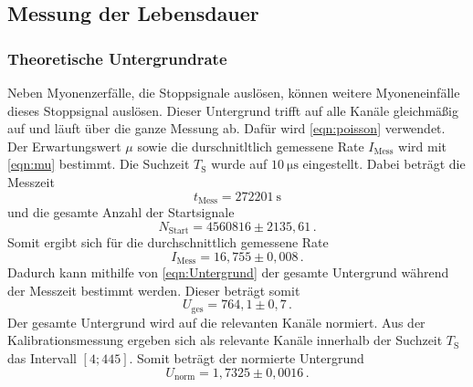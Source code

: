\subsection{Messung der Lebensdauer}
  \subsubsection{Theoretische Untergrundrate}
    Neben Myonenzerfälle, die Stoppsignale auslösen, können weitere Myoneneinfälle dieses Stoppsignal auslösen.
    Dieser Untergrund trifft auf alle Kanäle gleichmäßig auf und läuft über die ganze Messung ab.
    Dafür wird \eqref{eqn:poisson} verwendet.
    Der Erwartungswert $\mu$ sowie die durschnitltlich gemessene Rate $I_\text{Mess}$ wird mit \eqref{eqn:mu} bestimmt.
    Die Suchzeit $T_\text{S}$ wurde auf $\SI{10}{\micro\second}$ eingestellt.
    Dabei beträgt die Messzeit
    \begin{equation*}
      t_\text{Mess} = \SI{272201}{\second}
    \end{equation*}
    und die gesamte Anzahl der Startsignale
    \begin{equation*}
      N_\text{Start} = 4560816 \pm 2135,61 \, .
    \end{equation*}
    Somit ergibt sich für die durchschnittlich gemessene Rate
    \begin{equation*}
      I_\text{Mess} = 16,755 \pm 0,008 \, .
    \end{equation*}
    Dadurch kann mithilfe von \eqref{eqn:Untergrund} der gesamte Untergrund während der Messzeit bestimmt werden.
    Dieser beträgt somit
    \begin{equation*}
      U_\text{ges} = 764,1 \pm 0,7 \,.
    \end{equation*}
    Der gesamte Untergrund wird auf die relevanten Kanäle normiert.
    Aus der Kalibrationsmessung ergeben sich als relevante Kanäle innerhalb der Suchzeit $T_\text{S}$ das Intervall $[4;445]$.
    Somit beträgt der normierte Untergrund
    \begin{equation*}
      U_\text{norm} = 1,7325 \pm 0,0016 \, .
    \end{equation*}
  
